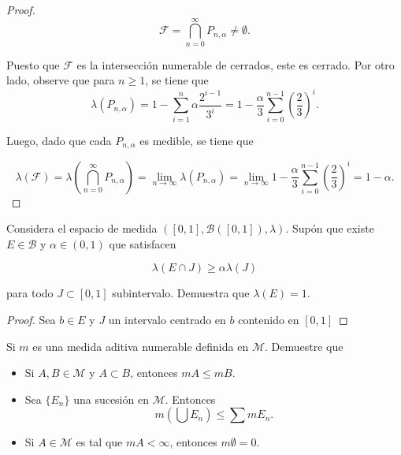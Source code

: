 \documentclass[12pt]{article}
\newenvironment{problem}[2][Problema]{\begin{trivlist}
\item[\hskip \labelsep {\bfseries #1}\hskip \labelsep {\bfseries #2.}]}{\end{trivlist}}
\begin{document}
\begin{proof}
$$ \mathcal{F} = \bigcap_{n=0}^\infty P_{n, \alpha} \neq \emptyset.$$

Puesto que $\mathcal{F}$ es la intersección numerable de cerrados, este es cerrado. Por otro lado, observe que para $n \geq 1$, se tiene que
$$\lambda(P_{n, \alpha}) = 1 - \sum_{i=1}^{n}{ \alpha \frac{2^{i-1}}{3^i}} = 1 - \frac{\alpha}{3} \sum_{i=0}^{n-1}{ \left(\frac{2}{3}\right)^i} .$$

Luego, dado que cada $P_{n,\alpha}$ es medible, se tiene que 

$$\lambda(\mathcal{F}) = \lambda\left(\bigcap_{n=0}^{\infty} P_{n, \alpha} \right) = \lim_{n\to \infty}\lambda(P_{n, \alpha}) =  \lim_{n\to \infty}1 - \frac{\alpha}{3} \sum_{i=0}^{n-1}{ \left(\frac{2}{3}\right)^i} = 1 - \alpha.  $$

\end{proof}

\text{ }
\begin{problem}{2}  Considera el espacio de medida $([0, 1], \mathbf{\mathcal{B}}([0, 1]), \lambda)$. Supón que existe $E \in \mathbf{\mathcal{B}}$ y $\alpha \in (0, 1)$ que satisfacen 

$$ \lambda(E \cap J) \geq  \alpha \lambda(J)$$

para todo $J\subset [0, 1]$ subintervalo. Demuestra que $\lambda(E) = 1.$
\end{problem}
\begin{proof} Sea $b \in E$ y $J$ un intervalo centrado en $b$ contenido en $[0,1]$
\end{proof}

\begin{problem}{3} Si $m$ es una medida aditiva numerable definida en $\mathcal M$. Demuestre que 

\begin{itemize}
    \item[a)] Si $A, B \in \mathcal M$ y $A \subset B $, entonces $m A \leq m B$. 
    \item[b)] Sea $\{ E_n \}$ una sucesión en $\mathcal M$. Entonces 
    $$ m\left( \bigcup E_n \right) \leq \sum m E_n.$$
    \item[c)] Si $A \in \mathcal M$ es tal que $m A < \infty $, entonces $m \emptyset = 0.$
\end{itemize}
\end{problem}
\end{document}
